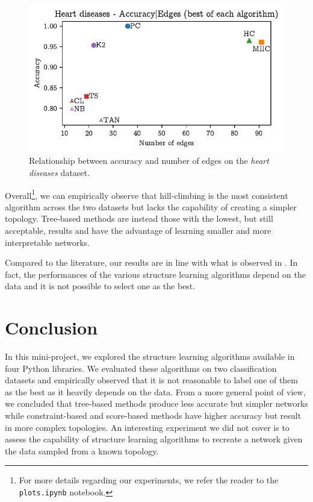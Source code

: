 \documentclass[letterpaper]{article}
\begin{document}
\begin{figure}[h]
    \centering
    \includegraphics[width=\linewidth]{img/heart_acc_edges.pdf}
    \caption{Relationship between accuracy and number of edges on the \textit{heart diseases} dataset.}
    \label{img:heart}
\end{figure}

Overall\footnote{For more details regarding our experiments, we refer the reader to the \texttt{plots.ipynb} notebook.}, 
we can empirically observe that hill-climbing is the most consistent algorithm
across the two datasets but lacks the capability of creating a simpler topology.
Tree-based methods are instead those with the lowest, but still acceptable, results and 
have the advantage of learning smaller and more interpretable networks.

Compared to the literature, our results are in line with what is observed in \cite{learning_comparison_2021}.
In fact, the performances of the various structure learning algorithms depend on the data and 
it is not possible to select one as the best.






\section{Conclusion}

In this mini-project, we explored the structure learning algorithms available in four Python libraries.
We evaluated these algorithms on two classification datasets and 
empirically observed that it is not reasonable to label one of them as the best as it heavily depends on the data.
From a more general point of view, we concluded that tree-based methods produce less accurate but simpler networks
while constraint-based and score-based methods have higher accuracy but result in more complex topologies.
An interesting experiment we did not cover is to assess the capability of structure learning algorithms to recreate
a network given the data sampled from a known topology.
\end{document}
